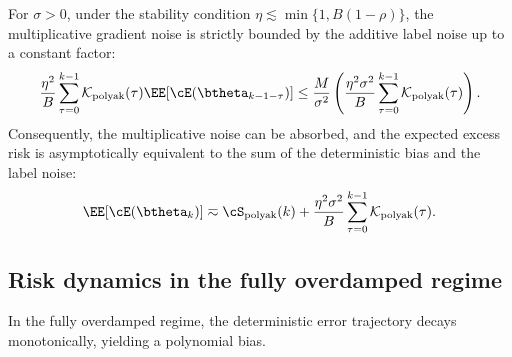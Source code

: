 \documentclass[11pt]{article}
\newcommand{\polyak}{\mathrm{polyak}}
\begin{document}
\begin{corollary}
\label{cor:pol_noise_absorption}
For $\sigma > 0$, under the stability condition $\eta \lesssim \min\{1,B(1-\rho)\}$, the multiplicative gradient noise is strictly bounded by the additive label noise up to a constant factor:
\[
    \frac{\eta^2}{B}\sum_{\tau=0}^{k-1}\mathcal{K}_{\polyak}(\tau)\EE[\cE(\btheta_{k-1-\tau})] \le \frac{M}{\sigma^2} \left( \frac{\eta^2\sigma^2}{B}\sum_{\tau=0}^{k-1}\mathcal{K}_{\polyak}(\tau) \right).
\]
Consequently, the multiplicative noise can be absorbed, and the expected excess risk is asymptotically equivalent to the sum of the deterministic bias and the label noise:
\[
    \EE[\cE(\btheta_k)] \eqsim \cS_{\polyak}(k) + \frac{\eta^2\sigma^2}{B}\sum_{\tau=0}^{k-1}\mathcal{K}_{\polyak}(\tau).
\]
\end{corollary}

\subsection{Risk dynamics in the fully overdamped regime}
\label{app:pol_fully_overdamped_loss}

In the fully overdamped regime, the deterministic error trajectory decays monotonically, yielding a polynomial bias.
\end{document}
